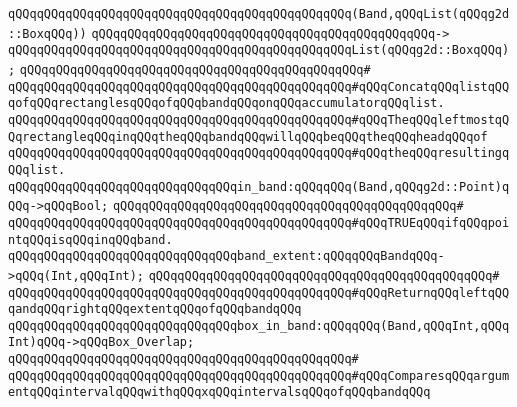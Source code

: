 \verb|qQQqqQQqqQQqqQQqqQQqqQQqqQQqqQQqqQQqqQQqqQQqqQQq(Band,qQQqList(qQQqg2d::BoxqQQq))|\newline
\verb|qQQqqQQqqQQqqQQqqQQqqQQqqQQqqQQqqQQqqQQqqQQqqQQq->|\newline
\verb|qQQqqQQqqQQqqQQqqQQqqQQqqQQqqQQqqQQqqQQqqQQqqQQqList(qQQqg2d::BoxqQQq);|\newline
\verb|qQQqqQQqqQQqqQQqqQQqqQQqqQQqqQQqqQQqqQQqqQQqqQQq#|\newline
\verb|qQQqqQQqqQQqqQQqqQQqqQQqqQQqqQQqqQQqqQQqqQQqqQQq#qQQqConcatqQQqlistqQQqofqQQqrectanglesqQQqofqQQqbandqQQqonqQQqaccumulatorqQQqlist.|\newline
\verb|qQQqqQQqqQQqqQQqqQQqqQQqqQQqqQQqqQQqqQQqqQQqqQQq#qQQqTheqQQqleftmostqQQqrectangleqQQqinqQQqtheqQQqbandqQQqwillqQQqbeqQQqtheqQQqheadqQQqof|\newline
\verb|qQQqqQQqqQQqqQQqqQQqqQQqqQQqqQQqqQQqqQQqqQQqqQQq#qQQqtheqQQqresultingqQQqlist.|\newline
\newline
\newline
\verb|qQQqqQQqqQQqqQQqqQQqqQQqqQQqqQQqin_band:qQQqqQQq(Band,qQQqg2d::Point)qQQq->qQQqBool;|\newline
\verb|qQQqqQQqqQQqqQQqqQQqqQQqqQQqqQQqqQQqqQQqqQQqqQQq#|\newline
\verb|qQQqqQQqqQQqqQQqqQQqqQQqqQQqqQQqqQQqqQQqqQQqqQQq#qQQqTRUEqQQqifqQQqpointqQQqisqQQqinqQQqband.|\newline
\newline
\newline
\verb|qQQqqQQqqQQqqQQqqQQqqQQqqQQqqQQqband_extent:qQQqqQQqBandqQQq->qQQq(Int,qQQqInt);|\newline
\verb|qQQqqQQqqQQqqQQqqQQqqQQqqQQqqQQqqQQqqQQqqQQqqQQq#|\newline
\verb|qQQqqQQqqQQqqQQqqQQqqQQqqQQqqQQqqQQqqQQqqQQqqQQq#qQQqReturnqQQqleftqQQqandqQQqrightqQQqextentqQQqofqQQqbandqQQq|\newline
\newline
\newline
\verb|qQQqqQQqqQQqqQQqqQQqqQQqqQQqqQQqbox_in_band:qQQqqQQq(Band,qQQqInt,qQQqInt)qQQq->qQQqBox_Overlap;|\newline
\verb|qQQqqQQqqQQqqQQqqQQqqQQqqQQqqQQqqQQqqQQqqQQqqQQq#|\newline
\verb|qQQqqQQqqQQqqQQqqQQqqQQqqQQqqQQqqQQqqQQqqQQqqQQq#qQQqComparesqQQqargumentqQQqintervalqQQqwithqQQqxqQQqintervalsqQQqofqQQqbandqQQq|\newline
\newline
\newline
